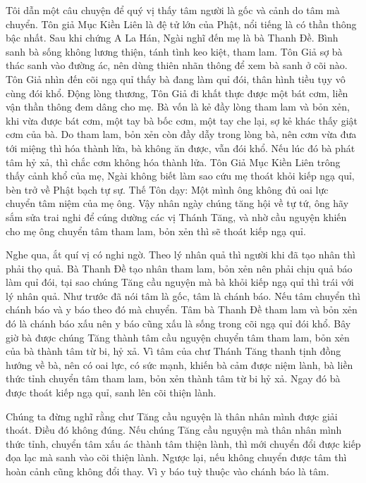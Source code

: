 \documentclass[
  12pt,
  oneside]{book}
\begin{document}
Tôi dẫn một câu chuyện để quý vị thấy tâm người là gốc và cảnh do tâm mà chuyển. Tôn giả Mục Kiền Liên là đệ tử lớn của Phật, nổi tiếng là có thần thông bậc nhất. Sau khi chứng A La Hán, Ngài nghĩ đến mẹ là bà Thanh Đề. Bình sanh bà sống không lương thiện, tánh tình keo kiệt, tham lam. Tôn Giả sợ bà thác sanh vào đường ác, nên dùng thiên nhãn thông để xem bà sanh ở cõi nào. Tôn Giả nhìn đến cõi ngạ quỉ thấy bà đang làm quỉ đói, thân hình tiều tụy vô cùng đói khổ. Động lòng thương, Tôn Giả đi khất thực được một bát cơm, liền vận thần thông đem dâng cho mẹ. Bà vốn là kẻ đầy lòng tham lam và bỏn xẻn, khi vừa được bát cơm, một tay bà bốc cơm, một tay che lại, sợ kẻ khác thấy giật cơm của bà. Do tham lam, bỏn xẻn còn đầy dẫy trong lòng bà, nên cơm vừa đưa tới miệng thì hóa thành lửa, bà không ăn được, vẫn đói khổ. Nếu lúc đó bà phát tâm hỷ xả, thì chắc cơm không hóa thành lửa. Tôn Giả Mục Kiền Liên trông thấy cảnh khổ của mẹ, Ngài không biết làm sao cứu mẹ thoát khỏi kiếp ngạ quỉ, bèn trở về Phật bạch tự sự. Thế Tôn dạy: Một mình ông không đủ oai lực chuyển tâm niệm của mẹ ông. Vậy nhân ngày chúng tăng hội về tự tứ, ông hãy sắm sửa trai nghi để cúng dường các vị Thánh Tăng, và nhờ cầu nguyện khiến cho mẹ ông chuyển tâm tham lam, bỏn xẻn thì sẽ thoát kiếp ngạ quỉ.

Nghe qua, ắt quí vị có nghi ngờ. Theo lý nhân quả thì người khi đã tạo nhân thì phải thọ quả. Bà Thanh Đề tạo nhân tham lam, bỏn xẻn nên phải chịu quả báo làm quỉ đói, tại sao chúng Tăng cầu nguyện mà bà khỏi kiếp ngạ quỉ thì trái với lý nhân quả. Như trước đã nói tâm là gốc, tâm là chánh báo. Nếu tâm chuyển thì chánh báo và y báo theo đó mà chuyển. Tâm bà Thanh Đề tham lam và bỏn xẻn đó là chánh báo xấu nên y báo cũng xấu là sống trong cõi ngạ quỉ đói khổ. Bây giờ bà được chúng Tăng thành tâm cầu nguyện chuyển tâm tham lam, bỏn xẻn của bà thành tâm từ bi, hỷ xả. Vì tâm của chư Thánh Tăng thanh tịnh đồng hướng về bà, nên có oai lực, có sức mạnh, khiến bà cảm được niệm lành, bà liền thức tỉnh chuyển tâm tham lam, bỏn xẻn thành tâm từ bi hỷ xả. Ngay đó bà được thoát kiếp ngạ quỉ, sanh lên cõi thiện lành.

Chúng ta đừng nghĩ rằng chư Tăng cầu nguyện là thân nhân mình được giải thoát. Điều đó không đúng. Nếu chúng Tăng cầu nguyện mà thân nhân mình thức tỉnh, chuyển tâm xấu ác thành tâm thiện lành, thì mới chuyển đổi được kiếp đọa lạc mà sanh vào cõi thiện lành. Ngược lại, nếu không chuyển được tâm thì hoàn cảnh cũng không đổi thay. Vì y báo tuỳ thuộc vào chánh báo là tâm.
\end{document}
